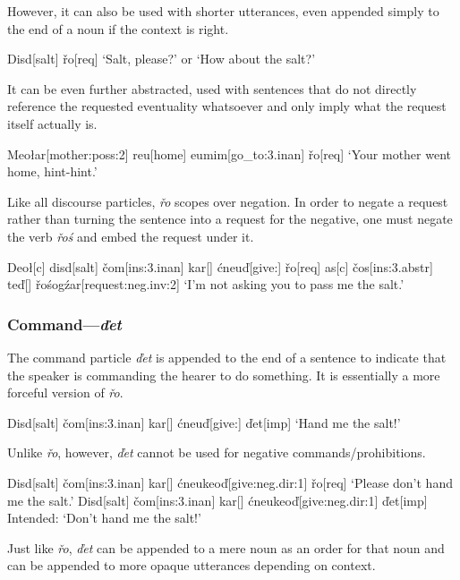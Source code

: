 \documentclass[a4paper,11pt,oneside,openany]{memoir}
\newcommand{\vd}{ď}
\newcommand{\vc}{č}
\newcommand{\vr}{ř}
\begin{document}
However, it can also be used with shorter utterances, even appended simply to the end of a noun if the context is right.

\ex
\begingl
Disd[salt]
\vr o[\sc req]
\glft `Salt, please?' or `How about the salt?'
\endgl
\xe

It can be even further abstracted, used with sentences that do not directly reference the requested eventuality whatsoever and only imply what the request itself actually is.

\ex
\begingl
Meo\l ar[mother:{\sc poss:2}]
reu[home]
eumim[go\_to:{\sc 3.inan}]
\vr o[\sc req]
\glft `Your mother went home, hint-hint.'
\endgl
\xe

Like all discourse particles, \textit{\vr o} scopes over negation. In order to negate a request rather than turning the sentence into a request for the negative, one must negate the verb \textit{\vr o\'s} and embed the request under it.

\ex
\begingl
Deo\l[\sc c]
disd[salt]
\vc om[\sc ins:3.inan]
kar[]
\'cneu\vd[give:{}]
\vr o[\sc req]
\nogloss{,}
as[\sc c]
\vc os[\sc ins:3.abstr]
te\vd[]
\vr o\'sog\'zar[request:{\sc neg.inv:2}]
\glft `I'm not asking you to pass me the salt.'
\endgl
\xe

\subsubsection{Command---\textit{\vd et}}

The command particle \textit{\vd et} is appended to the end of a sentence to indicate that the speaker is commanding the hearer to do something. It is essentially a more forceful version of \textit{\vr o}. 

\ex
\begingl
Disd[salt]
\vc om[\sc ins:3.inan]
kar[]
\'cneu\vd[give:{}]
\vd et[\sc imp]
\glft `Hand me the salt!'
\endgl
\xe

Unlike \textit{\vr o}, however, \textit{\vd et} cannot be used for negative commands/prohibitions.

\pex 
\a 
\begingl
Disd[salt]
\vc om[\sc ins:3.inan]
kar[]
\'cneukeo\vd[give:{\sc neg.dir:1}]
\vr o[\sc req]
\glft `Please don't hand me the salt.'
\endgl
\a \ljudge{\#}
\begingl
Disd[salt]
\vc om[\sc ins:3.inan]
kar[]
\'cneukeo\vd[give:{\sc neg.dir:1}]
\vd et[\sc imp]
\glft Intended: `Don't hand me the salt!'
\endgl
\xe

Just like \textit{\vr o}, \textit{\vd et} can be appended to a mere noun as an order for that noun and can be appended to more opaque utterances depending on context. 
\end{document}
